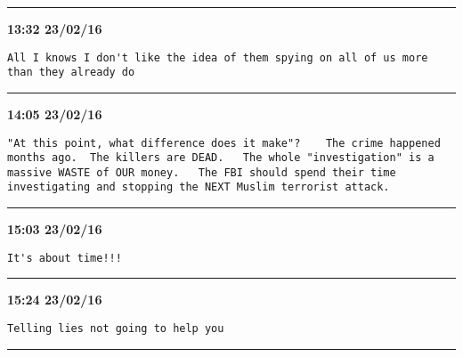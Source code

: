 \hrule%

\begin{adjustwidth}{0cm}{0cm}
\footnotesize \textbf{13:32 23/02/16}

\begin{lstlisting}[breaklines, breakatwhitespace, basicstyle=\small, frame=leftline]
All I knows I don't like the idea of them spying on all of us more than they already do
\end{lstlisting}
\end{adjustwidth}

\hrule%

\begin{adjustwidth}{0cm}{0cm}
\footnotesize \textbf{14:05 23/02/16}

\begin{lstlisting}[breaklines, breakatwhitespace, basicstyle=\small, frame=leftline]
"At this point, what difference does it make"?    The crime happened months ago.  The killers are DEAD.   The whole "investigation" is a massive WASTE of OUR money.   The FBI should spend their time investigating and stopping the NEXT Muslim terrorist attack.
\end{lstlisting}
\end{adjustwidth}

\hrule%

\begin{adjustwidth}{0cm}{0cm}
\footnotesize \textbf{15:03 23/02/16}

\begin{lstlisting}[breaklines, breakatwhitespace, basicstyle=\small, frame=leftline]
It's about time!!!
\end{lstlisting}
\end{adjustwidth}

\hrule%

\begin{adjustwidth}{0cm}{0cm}
\footnotesize \textbf{15:24 23/02/16}

\begin{lstlisting}[breaklines, breakatwhitespace, basicstyle=\small, frame=leftline]
Telling lies not going to help you
\end{lstlisting}
\end{adjustwidth}

\hrule%

